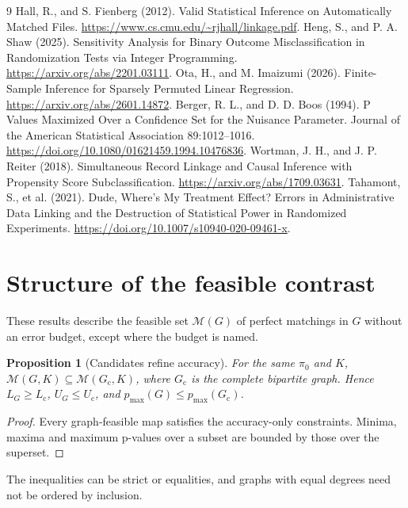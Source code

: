 \documentclass[11pt]{article}
\newtheorem{proposition}{Proposition}
\newcommand{\M}{\mathcal M}
\begin{document}
\begingroup\small
\begin{thebibliography}{9}
 Hall, R., and S. Fienberg (2012).
Valid Statistical Inference on Automatically Matched Files.
\url{https://www.cs.cmu.edu/~rjhall/linkage.pdf}.
 Heng, S., and P. A. Shaw (2025).
Sensitivity Analysis for Binary Outcome Misclassification in Randomization Tests via
Integer Programming. \url{https://arxiv.org/abs/2201.03111}.
 Ota, H., and M. Imaizumi (2026).
Finite-Sample Inference for Sparsely Permuted Linear Regression.
\url{https://arxiv.org/abs/2601.14872}.
 Berger, R. L., and D. D. Boos (1994).
P Values Maximized Over a Confidence Set for the Nuisance Parameter.
Journal of the American Statistical Association 89:1012--1016.
\url{https://doi.org/10.1080/01621459.1994.10476836}.
 Wortman, J. H., and J. P. Reiter (2018).
Simultaneous Record Linkage and Causal Inference with Propensity Score Subclassification.
\url{https://arxiv.org/abs/1709.03631}.
 Tahamont, S., et al. (2021).
Dude, Where's My Treatment Effect? Errors in Administrative Data Linking and the
Destruction of Statistical Power in Randomized Experiments.
\url{https://doi.org/10.1007/s10940-020-09461-x}.
\end{thebibliography}
\endgroup

\appendix
\section{Structure of the feasible contrast}
These results describe the feasible set $\M(G)$ of perfect matchings in $G$ without
an error budget, except where the budget is named.

\begin{proposition}[Candidates refine accuracy]
For the same $\pi_0$ and $K$, $\M(G,K)\subseteq\M(G_{\mathrm{c}},K)$, where $G_{\mathrm{c}}$
is the complete bipartite graph. Hence $L_G\ge L_{\mathrm{c}}$, $U_G\le U_{\mathrm{c}}$,
and $p_{\max}(G)\le p_{\max}(G_{\mathrm{c}})$.
\end{proposition}
\begin{proof}
Every graph-feasible map satisfies the accuracy-only constraints. Minima, maxima and
maximum p-values over a subset are bounded by those over the superset.
\end{proof}
The inequalities can be strict or equalities, and graphs with equal degrees need not be
ordered by inclusion.
\end{document}
